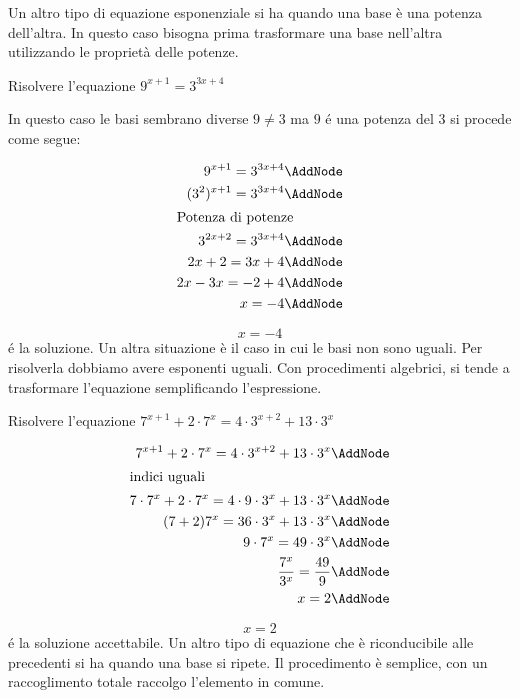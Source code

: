 Un altro tipo di equazione esponenziale si ha quando una base è una potenza dell'altra. In questo caso bisogna prima trasformare una base nell'altra utilizzando le proprietà delle potenze.
\begin{esempiot}
	Risolvere l'equazione $9^{x+1}=3^{3x+4}$
\end{esempiot}
	In questo caso le basi sembrano diverse $9\neq 3$ ma $9$ \'{e} una potenza del $3$ si procede come segue:
	\begin{NodesList}[margin=4cm]
		\begin{align*}
			9^{x+1}=3^{3x+4}\AddNode\\
			(3^2)^{x+1}=3^{3x+4}\AddNode\\
			\intertext{\hfil Potenza di potenze}
			3^{2x+2}=3^{3x+4}\AddNode\\
			2x+2=3x+4\AddNode\\
			2x-3x=-2+4\AddNode\\
			x=-4\AddNode
		\end{align*}
		\LinkNodes{}%
	\end{NodesList}
	\[x=-4\]
	\'{e} la soluzione.
Un altra situazione è il caso in cui le basi non sono uguali. Per risolverla dobbiamo avere esponenti uguali. Con procedimenti algebrici, si tende a trasformare l'equazione semplificando l'espressione. 
\begin{esempiot}{}{}
	Risolvere l'equazione $7^{x+1}+2\cdot7^{x}=4\cdot3^{x+2}+13\cdot 3^x$
\end{esempiot}
	\begin{NodesList} [margin=4cm]
		\begin{align*}
			7^{x+1}+2\cdot7^{x}=4\cdot3^{x+2}+13\cdot 3^x\AddNode\\
			\intertext{\hfil indici uguali}
			7\cdot7^x+2\cdot7^x=4\cdot9\cdot3^x+13\cdot3^x\AddNode\\
			(7+2)7^x=36\cdot3^x+13\cdot3^x\AddNode\\
			9\cdot7^x=49\cdot3^x\AddNode\\
			\dfrac{7^x}{3^x}=\dfrac{49}{9}\AddNode\\
			x=2\AddNode
		\end{align*}
	\end{NodesList}
	\[x=2\]
	\'{e} la soluzione accettabile.
Un altro tipo di equazione che è riconducibile alle precedenti si ha quando una base si ripete. Il procedimento è semplice, con un raccoglimento totale raccolgo l'elemento in comune. 
